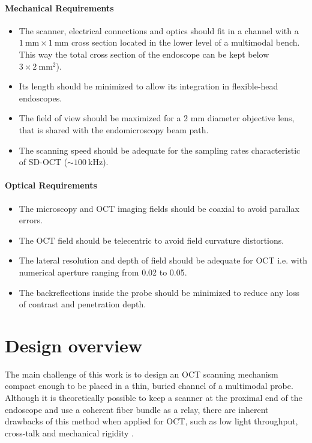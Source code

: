 \paragraph{Mechanical Requirements} 
\begin{itemize}

\item The scanner, electrical connections and optics should fit in a channel with a $\SI{1}{\milli\meter} \times \SI{1}{\milli\meter}$ cross section located in the lower level of a multimodal bench. This way the total cross section of the endoscope can be kept below $3 \times \SI{2}{\milli\meter^2}$). 
\item Its length should be minimized to allow its integration in flexible-head endoscopes.
\item The field of view should be maximized for a 2 mm diameter objective lens, that is shared with the endomicroscopy beam path.
\item The scanning speed should be adequate for the sampling rates characteristic of SD-OCT ($\sim \SI{100}{\kilo\hertz} $).
\end{itemize}


\paragraph{Optical Requirements}

\begin{itemize}
\item The microscopy and OCT imaging fields should be coaxial to avoid parallax errors. 
\item The OCT field should be telecentric to avoid field curvature distortions.
\item The lateral resolution and depth of field should be adequate for OCT i.e. with numerical aperture ranging from 0.02 to 0.05.
\item The backreflections inside the probe should be minimized to reduce any loss of contrast and penetration depth.
\end{itemize}

  

\section{Design overview}

The main challenge of this work is to design an OCT scanning mechanism compact enough to be placed in a thin, buried channel of a multimodal probe.  Although it is theoretically possible to keep a scanner at the proximal end of the endoscope and use a coherent fiber bundle as a relay, there are inherent drawbacks of this method when applied for OCT, such as low light throughput, cross-talk and mechanical rigidity \cite{Ford2009}. 

